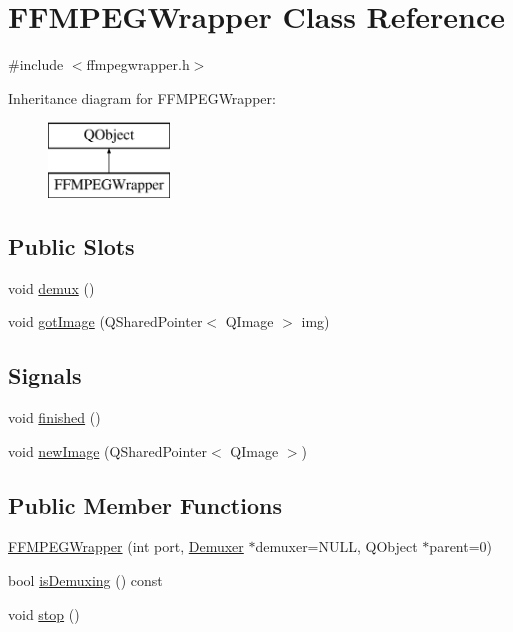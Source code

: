 \hypertarget{classFFMPEGWrapper}{\section{F\-F\-M\-P\-E\-G\-Wrapper Class Reference}
\label{classFFMPEGWrapper}
}


{\ttfamily \#include $<$ffmpegwrapper.\-h$>$}

Inheritance diagram for F\-F\-M\-P\-E\-G\-Wrapper\-:\begin{figure}[H]
\begin{center}
\leavevmode
\includegraphics[height=2.000000cm]{classFFMPEGWrapper}
\end{center}
\end{figure}
\subsection*{Public Slots}
\begin{DoxyCompactItemize}
\item 
void \hyperlink{classFFMPEGWrapper_a29bfb04c36db41f6a5dfee2c2669fb81}{demux} ()
\item 
void \hyperlink{classFFMPEGWrapper_a649288e95daaf556db954729d479589d}{got\-Image} (Q\-Shared\-Pointer$<$ Q\-Image $>$ img)
\end{DoxyCompactItemize}
\subsection*{Signals}
\begin{DoxyCompactItemize}
\item 
void \hyperlink{classFFMPEGWrapper_a40ad147b791bb875802826466ea94cf9}{finished} ()
\item 
void \hyperlink{classFFMPEGWrapper_a91a7fbecacc6d1b82661accd2126f846}{new\-Image} (Q\-Shared\-Pointer$<$ Q\-Image $>$)
\end{DoxyCompactItemize}
\subsection*{Public Member Functions}
\begin{DoxyCompactItemize}
\item 
\hyperlink{classFFMPEGWrapper_a5dece5b4d3637569611eaa1bc0a4bfcf}{F\-F\-M\-P\-E\-G\-Wrapper} (int port, \hyperlink{classDemuxer}{Demuxer} $\ast$demuxer=N\-U\-L\-L, Q\-Object $\ast$parent=0)
\item 
bool \hyperlink{classFFMPEGWrapper_a15893a6ead5df825bfd25fd7a04eb18d}{is\-Demuxing} () const 
\item 
void \hyperlink{classFFMPEGWrapper_a8bf46fe65fdb28b5e5642cc84a4a2b57}{stop} ()
\end{DoxyCompactItemize}


